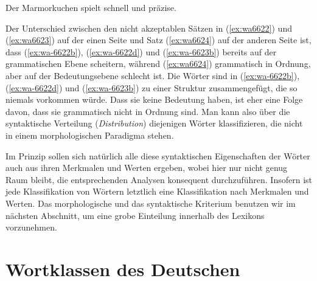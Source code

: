 \begin{exe}
  \ex\label{ex:wa6624}{Der Marmorkuchen spielt schnell und präzise.}
\end{exe}

Der Unterschied zwischen den nicht akzeptablen Sätzen in (\ref{ex:wa6622}) und (\ref{ex:wa6623}) auf der einen Seite und Satz (\ref{ex:wa6624}) auf der anderen Seite ist, dass (\ref{ex:wa-6622b}), (\ref{ex:wa-6622d}) und (\ref{ex:wa-6623b}) bereits auf der grammatischen Ebene scheitern, während (\ref{ex:wa6624}) grammatisch in Ordnung, aber auf der Bedeutungsebene schlecht ist.
Die Wörter sind in (\ref{ex:wa-6622b}), (\ref{ex:wa-6622d}) und (\ref{ex:wa-6623b}) zu einer Struktur zusammengefügt, die so niemals vorkommen würde.
Dass sie keine Bedeutung haben, ist eher eine Folge davon, dass sie grammatisch nicht in Ordnung sind.
Man kann also über die syntaktische Verteilung (\textit{Distribution}) diejenigen Wörter klassifizieren, die nicht in einem morphologischen Paradigma stehen.


Im Prinzip sollen sich natürlich alle diese syntaktischen Eigenschaften der Wörter auch aus ihren Merkmalen und Werten ergeben, wobei hier nur nicht genug Raum bleibt, die entsprechenden Analysen konsequent durchzuführen.
Insofern ist jede Klassifikation von Wörtern letztlich eine Klassifikation nach Merkmalen und Werten.
Das morphologische und das syntaktische Kriterium benutzen wir im nächsten Abschnitt, um eine grobe Einteilung innerhalb des Lexikons vorzunehmen.




\section{Wortklassen des Deutschen}

